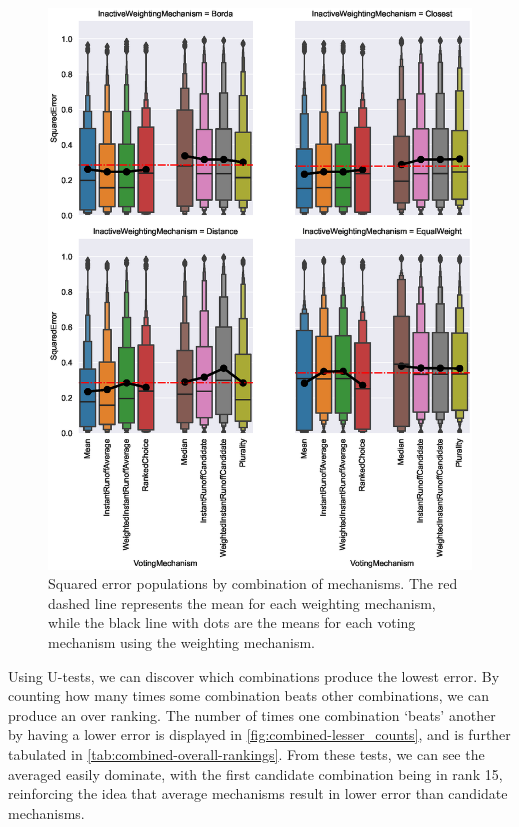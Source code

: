 \begin{figure}[htbp]
    \centering
    \includegraphics[scale=0.75]
    {./content/figures/combinations/combined_comparison}
    \caption{Squared error populations by combination of mechanisms. The red dashed
    line represents the mean for each weighting mechanism, while the black line with
    dots are the means for each voting mechanism using the weighting mechanism.}
    \label{fig:combined-comparison}
\end{figure}

Using U-tests, we can discover which combinations produce the lowest error.
By counting how many times some combination beats other combinations, we can produce
an over ranking.
The number of times one combination `beats' another by having a lower error is
displayed in \autoref{fig:combined-lesser_counts}, and is further tabulated in
\autoref{tab:combined-overall-rankings}.
From these tests, we can see the averaged easily dominate, with the first candidate
combination being in rank 15, reinforcing the idea that average mechanisms result in
lower error than candidate mechanisms.

